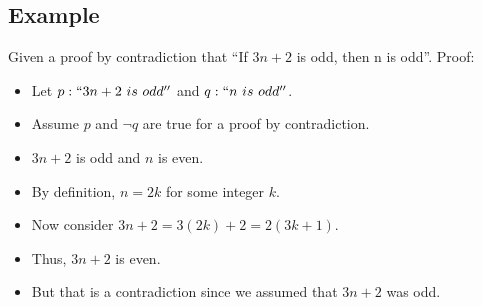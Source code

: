 \documentclass[letterpaper, 12pt]{math}
\begin{document}
\subsection*{Example}
Given a proof by contradiction that ``If \( 3n+2 \) is odd, then n is odd''.
Proof:
\begin{itemize}
  \item Let \( p: ``3n+2\ is\ odd'' \) and \( q: ``n\ is\ odd'' \).
  \item Assume \( p \) and \( \neg{q} \) are true for a proof by contradiction.
  \item \( 3n+2 \) is odd and \( n \) is even.
  \item By definition, \( n = 2k \) for some integer \( k \).
  \item Now consider \( 3n+2 = 3(2k)+2 = 2(3k+1) \).
  \item Thus, \( 3n+2 \) is even.
  \item But that is a contradiction since we assumed that \( 3n+2 \) was odd.
\end{itemize}
\end{document}
